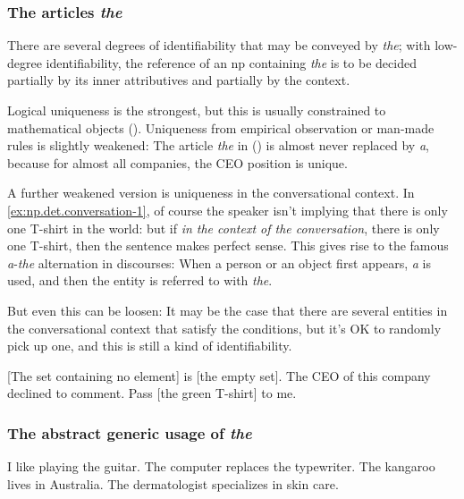 \documentclass[UTF8, a4paper, oneside, scheme=plain]{ctexrep}
\newcommand{\corpus}[1]{\emph{#1}}
\begin{document}
\subsubsection{The articles \corpus{the}}

There are several degrees of identifiability that may be conveyed by \corpus{the};
with low-degree identifiability, 
the reference of an \acs{np} containing \corpus{the} is 
to be decided partially by its inner attributives and partially by the context.

Logical uniqueness is the strongest, 
but this is usually constrained to mathematical objects
().
Uniqueness from empirical observation or man-made rules is slightly weakened:
The article \corpus{the} in ()
is almost never replaced by \corpus{a},
because for almost all companies,
the CEO position is unique.

A further weakened version is uniqueness in the conversational context.
In \eqref{ex:np.det.conversation-1}, 
of course the speaker isn't implying that there is only one T-shirt in the world:
but if \emph{in the context of the conversation},
there is only one T-shirt,
then the sentence makes perfect sense.
This gives rise to the famous \corpus{a}-\corpus{the} alternation in discourses:
When a person or an object first appears,
\corpus{a} is used,
and then the entity is referred to with \corpus{the}.

But even this can be loosen:
It may be the case that there are several entities in the conversational context
that satisfy the conditions,
but it's OK to randomly pick up one,
and this is still a kind of identifiability.

\begin{exe}
    \ex\label{ex:np.det.math-1} [The set containing no element] is [the empty set].
    \ex\label{ex:np.det.decline-to-comment} The CEO of this company declined to comment.
    \ex\label{ex:np.det.conversation-1} Pass [the green T-shirt] to me.
\end{exe}

\subsubsection{The abstract generic usage of \corpus{the}}

\begin{exe}
    \ex I like playing the guitar.
    \ex The computer replaces the typewriter.
    \ex The kangaroo lives in Australia.
    \ex The dermatologist specializes in skin care.
\end{exe}
\end{document}
